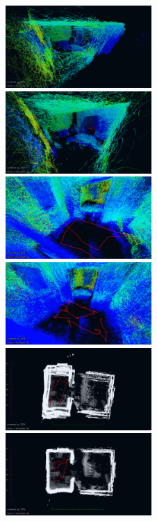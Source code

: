 \documentclass[5p]{elsarticle}
\begin{document}
\begin{figure}
        \centering
        \includegraphics[width=0.495\textwidth]{./images/jasper_uncorr_corner}\hfill
        \includegraphics[width=0.495\textwidth]{./images/jasper_corr_corner}\\
	\includegraphics[width=0.495\textwidth]{./images/jasper_uncorr_color}\hfill
	\includegraphics[width=0.495\textwidth]{./images/jasper_corr_color}\\
        \includegraphics[width=0.495\textwidth]{./images/jasper_uncorr_top}\hfill
        \includegraphics[width=0.495\textwidth]{./images/jasper_corr_top}

\end{figure}
\end{document}
